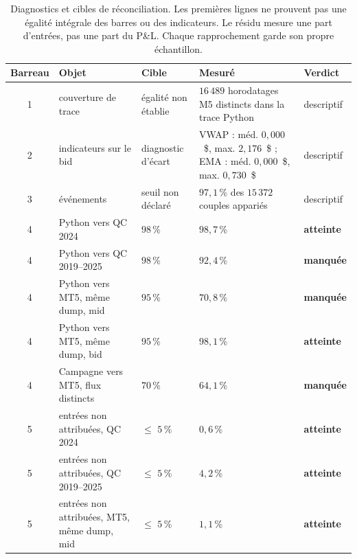 \begin{table}[htbp]
\centering
\footnotesize
\caption{Diagnostics et cibles de réconciliation. Les premières lignes ne prouvent pas une égalité intégrale des barres ou des indicateurs. Le résidu mesure une part d'entrées, pas une part du P\&L. Chaque rapprochement garde son propre échantillon.}
\label{tab:x10_rungs}
\begin{tabular}{c p{4.0cm} p{2.4cm} p{4.2cm} l}
\toprule
\textbf{Barreau} & \textbf{Objet} & \textbf{Cible} & \textbf{Mesuré} & \textbf{Verdict} \\
\midrule
1 & couverture de trace & égalité non établie & $16\,489$ horodatages M5 distincts dans la trace Python & descriptif \\
2 & indicateurs sur le bid & diagnostic d'écart & VWAP : méd. $0{,}000$~\$, max. $2{,}176$~\$ ; EMA : méd. $0{,}000$~\$, max. $0{,}730$~\$ & descriptif \\
3 & événements & seuil non déclaré & $97{,}1$\,\% des $15\,372$ couples appariés & descriptif \\
4 & Python vers QC 2024 & $98$\,\% & $98{,}7$\,\% & \textcolor{rsiGreen}{\textbf{atteinte}} \\
4 & Python vers QC 2019--2025 & $98$\,\% & $92{,}4$\,\% & \textcolor{combinedBurgundy}{\textbf{manquée}} \\
4 & Python vers MT5, même dump, mid & $95$\,\% & $70{,}8$\,\% & \textcolor{combinedBurgundy}{\textbf{manquée}} \\
4 & Python vers MT5, même dump, bid & $95$\,\% & $98{,}1$\,\% & \textcolor{rsiGreen}{\textbf{atteinte}} \\
4 & Campagne vers MT5, flux distincts & $70$\,\% & $64{,}1$\,\% & \textcolor{combinedBurgundy}{\textbf{manquée}} \\
5 & entrées non attribuées, QC 2024 & $\leq$ $5$\,\% & $0{,}6$\,\% & \textcolor{rsiGreen}{\textbf{atteinte}} \\
5 & entrées non attribuées, QC 2019--2025 & $\leq$ $5$\,\% & $4{,}2$\,\% & \textcolor{rsiGreen}{\textbf{atteinte}} \\
5 & entrées non attribuées, MT5, même dump, mid & $\leq$ $5$\,\% & $1{,}1$\,\% & \textcolor{rsiGreen}{\textbf{atteinte}} \\
\bottomrule
\end{tabular}
\end{table}
